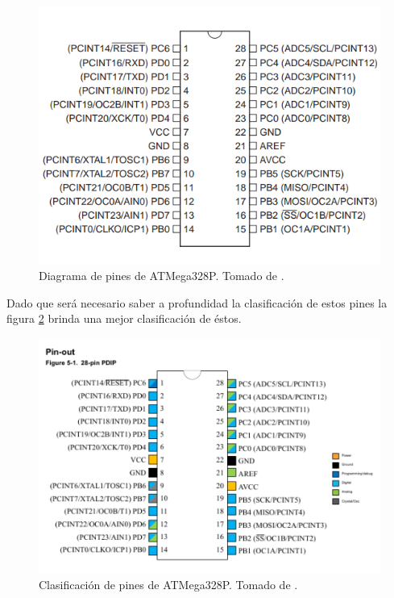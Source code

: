 \begin{figure}[H]
\centering
\includegraphics[width=.8\linewidth]{Imagenes/2.png}
 \caption{Diagrama de pines de ATMega328P. Tomado de \cite{web1}.}
 \label{fig2}
\end{figure}
Dado que será necesario saber a profundidad la clasificación de estos pines la figura \ref{fig2.1} brinda una mejor clasificación de éstos.
\begin{figure}[H]
\centering
\includegraphics[width=.8\linewidth]{Imagenes/2.1.png}
 \caption{Clasificación de pines de ATMega328P. Tomado de \cite{web5}.}
 \label{fig2.1}
\end{figure}

